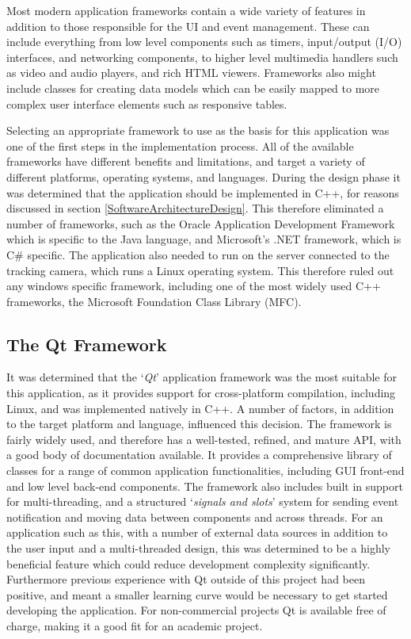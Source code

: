 Most modern application frameworks contain a wide variety of features in addition to those responsible for the UI and event management. These can include everything from low level components such as timers, input/output (I/O) interfaces, and networking components, to higher level multimedia handlers such as video and audio players, and rich HTML viewers. Frameworks also might include classes for creating data models which can be easily mapped to more complex user interface elements such as responsive tables.

Selecting an appropriate framework to use as the basis for this application was one of the first steps in the implementation process. All of the available frameworks have different benefits and limitations, and target a variety of different platforms, operating systems, and languages. During the design phase it was determined that the application should be implemented in C++, for reasons discussed in section \ref{SoftwareArchitectureDesign}. This therefore eliminated a number of frameworks, such as the Oracle Application Development Framework which is specific to the Java language, and Microsoft's .NET framework, which is C\# specific. The application also needed to run on the server connected to the tracking camera, which runs a Linux operating system. This therefore ruled out any windows specific framework, including one of the most widely used C++ frameworks, the Microsoft Foundation Class Library (MFC).

\subsection{The Qt Framework}
It was determined that the `\textit{Qt}' application framework was the most suitable for this application, as it provides support for cross-platform compilation, including Linux, and was implemented natively in C++. A number of factors, in addition to the target platform and language, influenced this decision. The framework is fairly widely used, and therefore has a well-tested, refined, and mature API, with a good body of documentation available. It provides a comprehensive library of classes for a range of common application functionalities, including GUI front-end and low level back-end components. The framework also includes built in support for multi-threading, and a structured `\textit{signals and slots}' system for sending event notification and moving data between components and across threads. For an application such as this, with a number of external data sources in addition to the user input and a multi-threaded design, this was determined to be a highly beneficial feature which could reduce development complexity significantly. Furthermore previous experience with Qt outside of this project had been positive, and meant a smaller learning curve would be necessary to get started developing the application. For non-commercial projects Qt is available free of charge, making it a good fit for an academic project.

